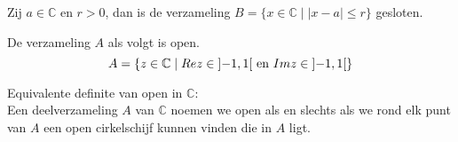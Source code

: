 \documentclass[main.tex]{subfiles}
\begin{document}
\begin{vb}
  Zij $a\in \mathbb{C}$ en $r>0$, dan is de verzameling $B = \{x\in \mathbb{C}\mid |x-a|\le r\}$ gesloten.

\end{vb}

\begin{vb}
  De verzameling $A$ als volgt is open.
  \[ A = \left\{z \in \mathbb{C} \mid Re z \in \interval[open]{-1}{1} \text{ en } Im z \in \interval[open]{-1}{1} \right\} \]

\end{vb}

\begin{st}
  Equivalente definite van open in $\mathbb{C}$:\\
  Een deelverzameling $A$ van $\mathbb{C}$ noemen we open als en slechts als we rond elk punt van $A$ een open cirkelschijf kunnen vinden die in $A$ ligt.
\end{st}




\end{document}
